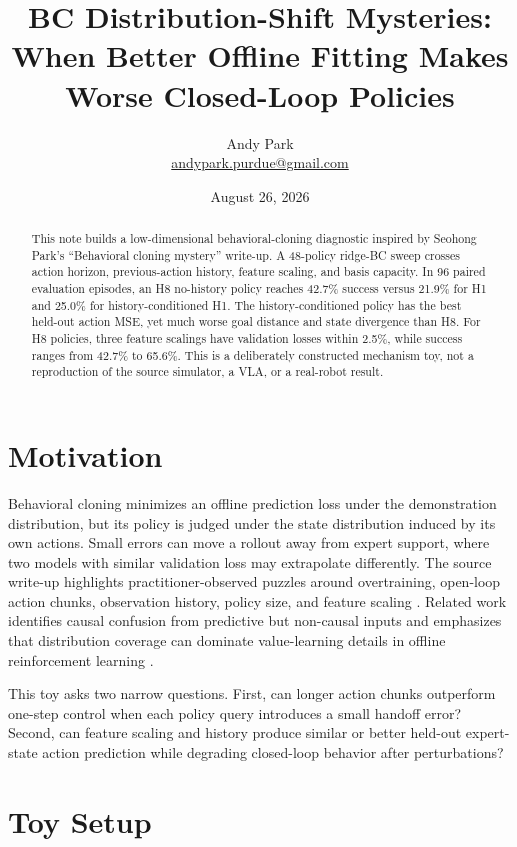 \documentclass[11pt]{article}
\title{BC Distribution-Shift Mysteries:\\When Better Offline Fitting Makes Worse Closed-Loop Policies}
\author{Andy Park\\\href{mailto:andypark.purdue@gmail.com}{andypark.purdue@gmail.com}}
\date{August 26, 2026}
\begin{document}
\maketitle

\begin{abstract}
This note builds a low-dimensional behavioral-cloning diagnostic inspired by Seohong Park's ``Behavioral cloning mystery'' write-up. A 48-policy ridge-BC sweep crosses action horizon, previous-action history, feature scaling, and basis capacity. In 96 paired evaluation episodes, an H8 no-history policy reaches 42.7\% success versus 21.9\% for H1 and 25.0\% for history-conditioned H1. The history-conditioned policy has the best held-out action MSE, yet much worse goal distance and state divergence than H8. For H8 policies, three feature scalings have validation losses within 2.5\%, while success ranges from 42.7\% to 65.6\%. This is a deliberately constructed mechanism toy, not a reproduction of the source simulator, a VLA, or a real-robot result.
\end{abstract}

\section{Motivation}

Behavioral cloning minimizes an offline prediction loss under the demonstration distribution, but its policy is judged under the state distribution induced by its own actions. Small errors can move a rollout away from expert support, where two models with similar validation loss may extrapolate differently. The source write-up highlights practitioner-observed puzzles around overtraining, open-loop action chunks, observation history, policy size, and feature scaling \cite{park-blog}. Related work identifies causal confusion from predictive but non-causal inputs \cite{dehaan2019} and emphasizes that distribution coverage can dominate value-learning details in offline reinforcement learning \cite{park2024}.

This toy asks two narrow questions. First, can longer action chunks outperform one-step control when each policy query introduces a small handoff error? Second, can feature scaling and history produce similar or better held-out expert-state action prediction while degrading closed-loop behavior after perturbations?

\section{Toy Setup}
\end{document}
